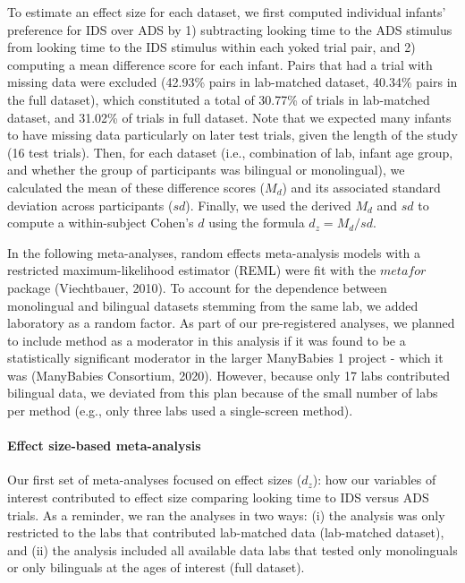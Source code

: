 \documentclass[
  english,
  ,man,floatsintext]{apa6}
\let\oldparagraph\paragraph
\renewcommand{\paragraph}[1]{\oldparagraph{#1}\mbox{}}
\begin{document}
To estimate an effect size for each dataset, we first computed individual infants' preference for IDS over ADS by 1) subtracting looking time to the ADS stimulus from looking time to the IDS stimulus within each yoked trial pair, and 2) computing a mean difference score for each infant. Pairs that had a trial with missing data were excluded (42.93\% pairs in lab-matched dataset, 40.34\% pairs in the full dataset), which constituted a total of 30.77\% of trials in lab-matched dataset, and 31.02\% of trials in full dataset. Note that we expected many infants to have missing data particularly on later test trials, given the length of the study (16 test trials). Then, for each dataset (i.e., combination of lab, infant age group, and whether the group of participants was bilingual or monolingual), we calculated the mean of these difference scores (\(M_d\)) and its associated standard deviation across participants (\(sd\)). Finally, we used the derived \(M_d\) and \(sd\) to compute a within-subject Cohen's \(d\) using the formula \(d_z = M_d/sd\).

In the following meta-analyses, random effects meta-analysis models with a restricted maximum-likelihood estimator (REML) were fit with the \(metafor\) package (Viechtbauer, 2010). To account for the dependence between monolingual and bilingual datasets stemming from the same lab, we added laboratory as a random factor. As part of our pre-registered analyses, we planned to include method as a moderator in this analysis if it was found to be a statistically significant moderator in the larger ManyBabies 1 project - which it was (ManyBabies Consortium, 2020). However, because only 17 labs contributed bilingual data, we deviated from this plan because of the small number of labs per method (e.g., only three labs used a single-screen method).

\hypertarget{effect-size-based-meta-analysis}{%
\paragraph{Effect size-based meta-analysis}\label{effect-size-based-meta-analysis}}

Our first set of meta-analyses focused on effect sizes (\(d_z\)): how our variables of interest contributed to effect size comparing looking time to IDS versus ADS trials. As a reminder, we ran the analyses in two ways: (i) the analysis was only restricted to the labs that contributed lab-matched data (lab-matched dataset), and (ii) the analysis included all available data labs that tested only monolinguals or only bilinguals at the ages of interest (full dataset).
\end{document}
